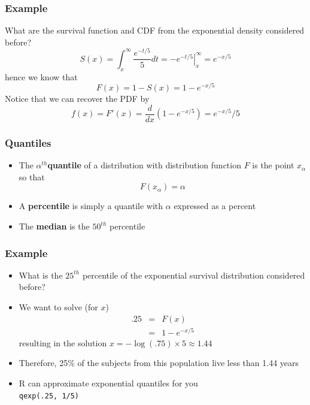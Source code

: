 \documentclass{beamer}
\begin{document}
\begin{frame}
\frametitle{Example}
What are the survival function and CDF from the exponential density considered before?
$$
S(x) = \int_x^\infty  \frac{e^{-t/5}}{5}dt =  \left. -e^{-t/5} \right|_{x}^\infty = e^{-x/5}
$$
hence we know that
$$
F(x) = 1 - S(x) = 1 - e^{-x/5}
$$
Notice that we can recover the PDF by
$$
f(x) = F'(x) = \frac{d}{dx} (1 -  e^{-x/5}) = e^{-x/5}/5
$$
\end{frame}


\begin{frame}
\frametitle{Quantiles}
\begin{itemize}
\item The  {\bf $\alpha^{th}$quantile} of a distribution with distribution function 
$F$ is the point $x_\alpha$ so that
$$
F(x_\alpha) = \alpha
$$
\item A {\bf percentile} is simply a quantile with $\alpha$ expressed as a percent
\item The {\bf median} is the $50^{th}$ percentile
\end{itemize}
\end{frame}

\begin{frame}
\frametitle{Example}
\begin{itemize}
\item  What is the $25^{th}$ percentile of the exponential survival distribution considered before?
\item We want to solve (for $x$)
\begin{eqnarray*}
.25 & = & F(x) \\  
    & = & 1 - e^{-x/5}
\end{eqnarray*}
resulting in the solution $x = -\log(.75) \times 5 \approx 1.44$
\item Therefore, 25\% of the
subjects from this population live less than 1.44 years
\item R can approximate exponential quantiles for you \\
\texttt{qexp(.25, 1/5)}
\end{itemize}
\end{frame}
\end{document}

